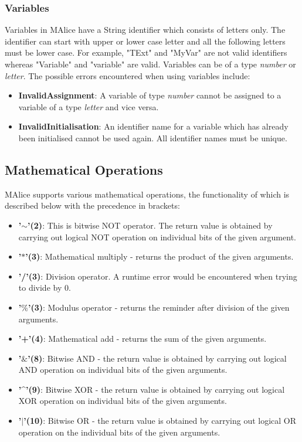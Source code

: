 \documentclass[a4wide, 11pt]{article}
\begin{document}
	\subsubsection{Variables}
		\label{sec:var}
			Variables in MAlice have a String identifier which consists of letters only.
			The identifier can start with upper or lower case letter and all the 
			following letters must be lower case. For example, "TExt" and "MyVar" are not 
			valid identifiers whereas "Variable" and "variable" are valid. Variables 
			can be of a type \emph{number} or \emph{letter}. The possible errors encountered
			when using variables include:
			\begin{itemize}
				\item {\bf InvalidAssignment}: A variable of type \emph{number} cannot be 
					assigned to a variable of a type \emph{letter} and vice versa.
				\item {\bf InvalidInitialisation}: An identifier name for a variable which 
					has already been initialised cannot	be used again. All identifier names 
					must be unique.
			\end{itemize}
	
	\subsection{Mathematical Operations}
	\label{sec:mathOper}
		MAlice supports various mathematical operations, the functionality of which is 
		described below with the precedence in brackets:
		\begin{itemize}
			\item {\bf '$\mathtt{\sim}$'(2)}: This is bitwise NOT operator. The return value is obtained by carrying
				out logical NOT operation on individual bits of the given argument.
			\item {\bf '$\ast$'(3)}: Mathematical multiply - returns the product of the
				given arguments.
			\item {\bf '/'(3)}: Division operator. A runtime error would be encountered 
				when trying to	divide by 0.
			\item {\bf '$\%$'(3)}: Modulus operator - returns the reminder after division of 
				the given arguments.
			\item {\bf '+'(4)}: Mathematical add - returns the sum of the given arguments.
			\item {\bf '$\&$'(8)}: Bitwise AND - the return value is obtained by carrying out 
				logical AND operation on individual bits of the given arguments.
			\item {\bf '\^{ }'(9)}: Bitwise XOR - the return value is obtained by carrying out 
				logical XOR operation on individual bits of the given arguments.
			\item {\bf '$\mid$'(10)}: Bitwise OR - the return value is obtained by carrying out 
				logical OR operation on the individual bits of the given arguments.
		\end{itemize}
 
\end{document}
